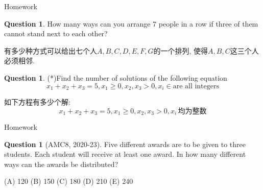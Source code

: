 \documentclass{beamer}
\theoremstyle{definition}
\newtheorem{ques}[defn]{Question}
\begin{document}
\begin{frame}{Homework}
    \begin{ques}
        How many ways can you arrange $7$ people in a row if three of them cannot stand next to each other?

        有多少种方式可以给出七个人$A,B,C,D,E,F,G$的一个排列, 使得$A,B,C$这三个人必须相邻.
    \end{ques}
    \begin{ques}
        (*)Find the number of solutions of the following equation
        \begin{equation*}
            x_1+x_2+x_3=5, x_1\ge 0, x_2,x_3>0, x_i\in \text{are all integers}
        \end{equation*}

        如下方程有多少个解:
        \begin{equation*}
            x_1+x_2+x_3=5, x_1\ge 0, x_2,x_3>0, x_i\,\text{均为整数}
        \end{equation*}
    \end{ques}
\end{frame}
\begin{frame}{Homework}
    \begin{ques}[AMC8, 2020-23]
        Five different awards are to be given to three students. Each student will receive at least one award. In how many different ways can the awards be distributed?

        (A) 120 (B) 150 (C) 180 (D) 210 (E) 240
    \end{ques}
\end{frame}
\end{document}
